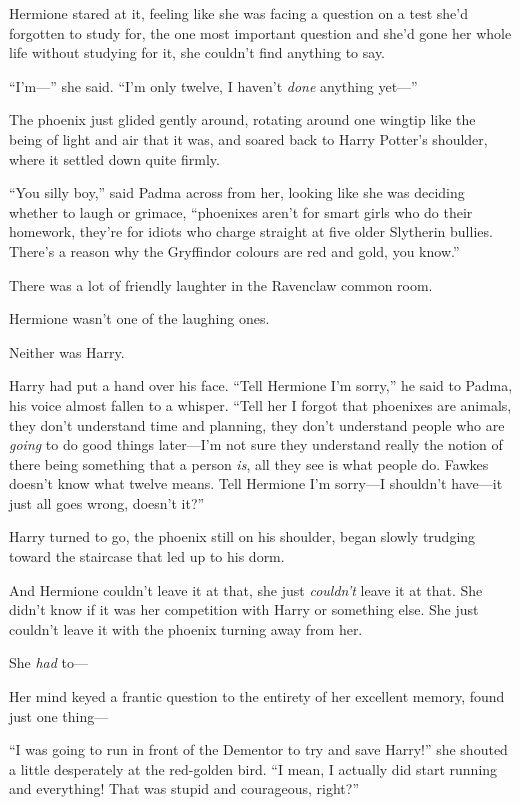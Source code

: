 Hermione stared at it, feeling like she was facing a question on a test she’d forgotten to study for, the one most important question and she’d gone her whole life without studying for it, she couldn’t find anything to say.

“I’m—” she said. “I’m only twelve, I haven’t \emph{done} anything yet—”

The phoenix just glided gently around, rotating around one wingtip like the being of light and air that it was, and soared back to Harry Potter’s shoulder, where it settled down quite firmly.

“You silly boy,” said Padma across from her, looking like she was deciding whether to laugh or grimace, “phoenixes aren’t for smart girls who do their homework, they’re for idiots who charge straight at five older Slytherin bullies. There’s a reason why the Gryffindor colours are red and gold, you know.”

There was a lot of friendly laughter in the Ravenclaw common room.

Hermione wasn’t one of the laughing ones.

Neither was Harry.

Harry had put a hand over his face. “Tell Hermione I’m sorry,” he said to Padma, his voice almost fallen to a whisper. “Tell her I forgot that phoenixes are animals, they don’t understand time and planning, they don’t understand people who are \emph{going} to do good things later—I’m not sure they understand really the notion of there being something that a person \emph{is}, all they see is what people do. Fawkes doesn’t know what twelve means. Tell Hermione I’m sorry—I shouldn’t have—it just all goes wrong, doesn’t it?”

Harry turned to go, the phoenix still on his shoulder, began slowly trudging toward the staircase that led up to his dorm.

And Hermione couldn’t leave it at that, she just \emph{couldn’t} leave it at that. She didn’t know if it was her competition with Harry or something else. She just couldn’t leave it with the phoenix turning away from her.

She \emph{had} to—

Her mind keyed a frantic question to the entirety of her excellent memory, found just one thing—

“I was going to run in front of the Dementor to try and save Harry!” she shouted a little desperately at the red-golden bird. “I mean, I actually did start running and everything! That was stupid and courageous, right?”

